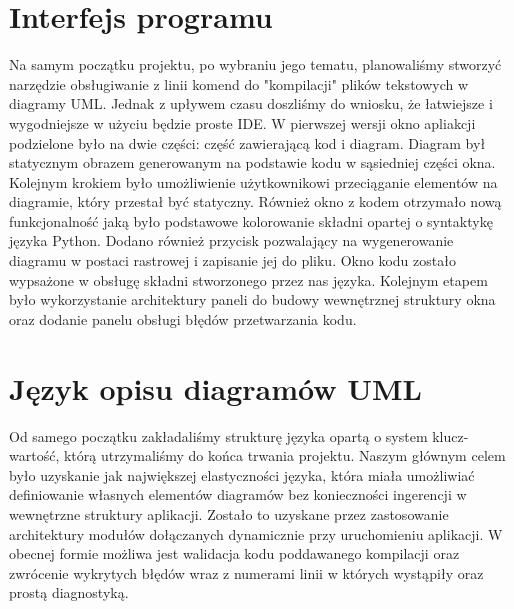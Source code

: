 \section{Interfejs programu}
Na samym początku projektu, po wybraniu jego tematu, planowaliśmy stworzyć narzędzie obsługiwanie z linii komend do "kompilacji" plików tekstowych w diagramy UML. Jednak z upływem czasu doszliśmy do wniosku, że łatwiejsze i wygodniejsze w użyciu będzie proste IDE. W pierwszej wersji okno apliakcji podzielone było na dwie części: część zawierającą kod i diagram. Diagram był statycznym obrazem generowanym na podstawie kodu w sąsiedniej części okna. Kolejnym krokiem było umożliwienie użytkownikowi przeciąganie elementów na diagramie, który przestał być statyczny. Również okno z kodem otrzymało nową funkcjonalność jaką było podstawowe kolorowanie składni opartej o syntaktykę języka Python. Dodano również przycisk pozwalający na wygenerowanie diagramu w postaci rastrowej i zapisanie jej do pliku. Okno kodu zostało wypsażone w obsługę składni stworzonego przez nas języka. Kolejnym etapem było wykorzystanie architektury paneli do budowy wewnętrznej struktury okna oraz dodanie panelu obsługi błędów przetwarzania kodu.
\section{Język opisu diagramów UML}
Od samego początku zakładaliśmy strukturę języka opartą o system klucz-wartość, którą utrzymaliśmy do końca trwania projektu. Naszym głównym celem było uzyskanie jak największej elastyczności języka, która miała umożliwiać definiowanie własnych elementów diagramów bez konieczności ingerencji w wewnętrzne struktury aplikacji. Zostało to uzyskane przez zastosowanie architektury modułów dołączanych dynamicznie przy uruchomieniu aplikacji. W obecnej formie możliwa jest walidacja kodu poddawanego kompilacji oraz zwrócenie wykrytych błędów wraz z numerami linii w których wystąpiły oraz prostą diagnostyką.
